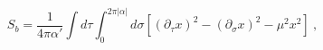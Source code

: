 \begin{equation}
S_b = \frac{1}{4 \pi \alpha'} \int d\tau \int_{0}^{2 \pi
|\alpha|} d \sigma \left[ (\partial_{\tau} x)^2 - (\partial_{\sigma}
x)^2 - \mu^2 x^2 \right]~,
\label{bos45}
\end{equation}

